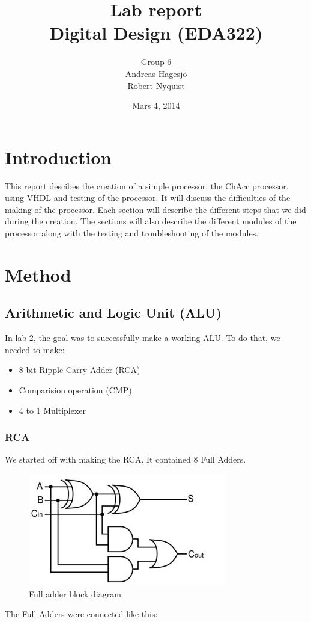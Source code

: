 \documentclass[a4paper]{article}
\title{\bf \LARGE Lab report\\
Digital Design (EDA322)}
\author{Group 6
\vspace{0.4cm}\\
Andreas Hagesjö \\ Robert Nyquist}
\date{Mars 4, 2014}
\begin{document}
\maketitle
\thispagestyle{empty}
\newpage
\tableofcontents
\thispagestyle{empty}
\newpage

\setcounter {page}{1}
\section{Introduction}
This report descibes the creation of a simple processor, the ChAcc processor, using VHDL and testing of the processor.
It will discuss the difficulties of the making of the processor.
Each section will describe the different steps that we did during the creation. The sections will also describe the different modules of the processor along with the testing and troubleshooting of the modules.

\section{Method}
\subsection{Arithmetic and Logic Unit (ALU)}

In lab 2, the goal was to successfully make a working ALU. To do that, we needed to make:

\begin{itemize}

  \item 8-bit Ripple Carry Adder (RCA)
  \item Comparision operation (CMP)
  \item 4 to 1 Multiplexer

\end{itemize}

\subsubsection{RCA}
We started off with making the RCA. It contained 8 Full Adders.



\begin{figure}[H]
 \centering
 \includegraphics[scale=0.5]{HAFA}
 \caption{Full adder block diagram}
\end{figure}
\newpage
The Full Adders were connected like this:\\
\end{document}
